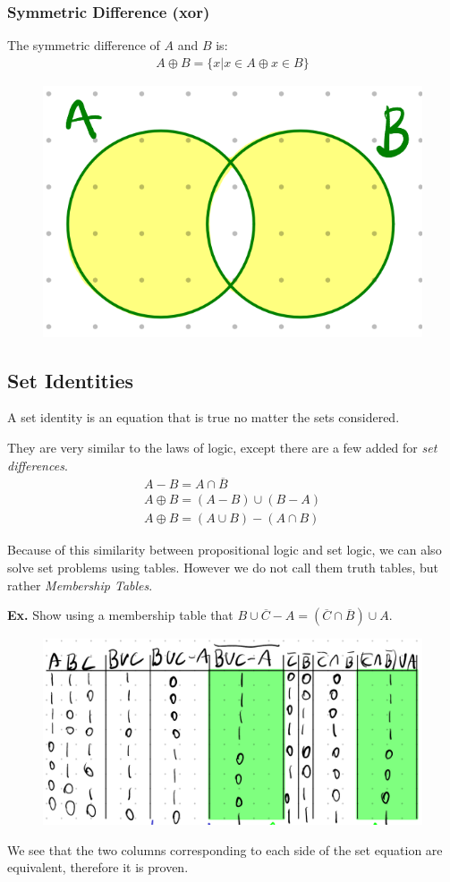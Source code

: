 \documentclass[12pt,letterpaper]{article} \usepackage{amsmath} \usepackage{graphicx}  \usepackage{longtable}  \usepackage{amssymb}
\begin{document}
            \subsubsection{Symmetric Difference (xor)}
            The symmetric difference of $A$ and $B$ is:
            \begin{align*}
                A \oplus B = \{x | x\in A \oplus x \in B\}
            \end{align*}

            \begin{figure}[H]
                \centering
                \includegraphics[width=0.3\linewidth]{symmetric_diff.png}
            \end{figure}

        \subsection{Set Identities}
        A set identity is an equation that is true no matter the sets considered. 

        They are very similar to the laws of logic, except there are a few added for \emph{set differences}. 
        \begin{align*}
            A-B=A\cap \overline{B}\\
            A\oplus B = (A-B) \cup (B-A)\\
            A\oplus B = (A\cup B) - (A\cap B)
        \end{align*}

        Because of this similarity between propositional logic and set logic, we can also solve set problems using tables. However we do not call them truth tables, but rather \emph{Membership Tables}.

        \begin{mdframed}
            \textbf{Ex. } Show using a membership table that $\overline{B\cup C - A} = (\overline{C}\cap \overline{B})\cup A$.
            \begin{figure}[H]
                \centering
                \includegraphics[width=0.6\linewidth]{ex5.png}
            \end{figure}
            We see that the two columns corresponding to each side of the set equation are equivalent, therefore it is proven.
        \end{mdframed}
\end{document}
